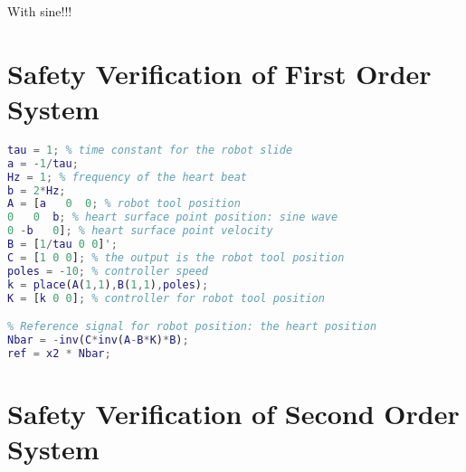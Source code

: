 With sine!!!

\section{Safety Verification of First Order System}

\begin{lstlisting}[language=matlab]
% Define state-space system with x1 = robot position, x2 = heart position, x3 = heart velocity
tau = 1; % time constant for the robot slide
a = -1/tau;
Hz = 1; % frequency of the heart beat
b = 2*Hz;
A = [a   0  0; % robot tool position
0   0  b; % heart surface point position: sine wave
0 -b   0]; % heart surface point velocity
B = [1/tau 0 0]';
C = [1 0 0]; % the output is the robot tool position
poles = -10; % controller speed
k = place(A(1,1),B(1,1),poles);
K = [k 0 0]; % controller for robot tool position

% Reference signal for robot position: the heart position
Nbar = -inv(C*inv(A-B*K)*B);
ref = x2 * Nbar;
\end{lstlisting}

\section{Safety Verification of Second Order System}